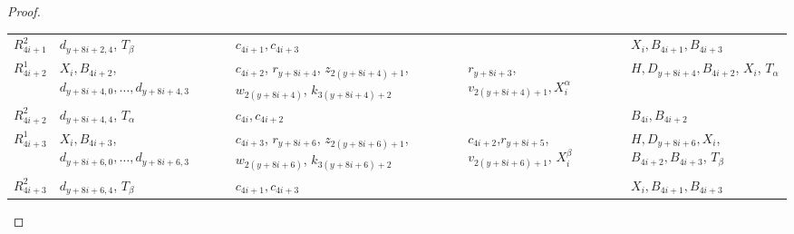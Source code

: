 \documentclass[english]{lipics_hacked}
\begin{document}
\begin{proof}
\begin{longtable}{p{0.7cm} p{3cm}   p{2.5cm}    p{2.5cm}      p{2.7cm}  }
%
$R_{4i+1}^2$ &  $d_{y+8i+2,4}$, $T_\beta$ & $c_{4i+1},c_{4i+3}$ & & $X_i,B_{4i+1},B_{4i+3}$\\
%
$R_{4i+2}^1$ & $X_i,B_{4i+2}$, $d_{y+8i+4,0},\dots, d_{y+8i+4,3}$ & $c_{4i+2}$, $r_{y+8i+4}$, $z_{2(y+8i+4)+1}$, $w_{2(y+8i+4)}$, $k_{3(y+8i+4)+2}$ & $r_{y+8i+3}$, $v_{2(y+8i+4)+1},X_i^\alpha$ & $H, D_{y+8i+4},B_{4i+2}$, $X_i$, $T_\alpha$ \\
%
$R_{4i+2}^2$ & $d_{y+8i+4,4}$, $T_\alpha$ & $c_{4i},c_{4i+2}$& & $B_{4i},B_{4i+2}$ \\
$R_{4i+3}^1$ & $X_i,B_{4i+3}$, $d_{y+8i+6,0},\dots, d_{y+8i+6,3}$ & $c_{4i+3}$, $r_{y+8i+6}$, $z_{2(y+8i+6)+1}$, $w_{2(y+8i+6)}$, $k_{3(y+8i+6)+2}$ & $c_{4i+2}$,$r_{y+8i+5}$, $v_{2(y+8i+6)+1}$, $X_{i}^\beta$ & $H, D_{y+8i+6},X_i$, $B_{4i+2},B_{4i+3}$, $T_\beta$ \\						
%
%
$R_{4i+3}^2$ &  $d_{y+8i+6,4}$, $T_\beta$ & $c_{4i+1},c_{4i+3}$ & & $X_i,B_{4i+1},B_{4i+3}$
%
\end{longtable}
\end{proof}
\end{document}
